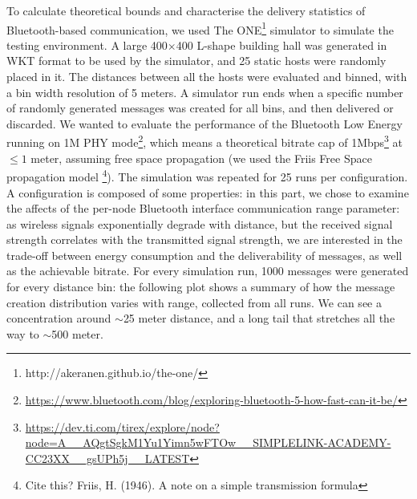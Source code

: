 To calculate theoretical bounds and characterise the delivery statistics of Bluetooth-based communication, we used The ONE\footnote{http://akeranen.github.io/the-one/} simulator to simulate the testing environment.
A large 400$\times$400 L-shape building hall was generated in WKT format to be used by the simulator, and 25 static hosts were randomly placed in it.
The distances between all the hosts were evaluated and binned, with a bin width resolution of 5 meters.
A simulator run ends when a specific number of randomly generated messages was created for all bins, and then delivered or discarded.
We wanted to evaluate the performance of the Bluetooth Low Energy running on 1M PHY mode\footnote{\href{Bluetooth SIG}{\url{https://www.bluetooth.com/blog/exploring-bluetooth-5-how-fast-can-it-be/}}}, which means a theoretical bitrate cap of 1Mbps\footnote{\href{Texas Instruments}{\url{https://dev.ti.com/tirex/explore/node?node=A__AQgtSgkM1Yu1Yimn5wFTOw__SIMPLELINK-ACADEMY-CC23XX__gsUPh5j__LATEST}}} at $\le1$ meter, assuming free space propagation (we used the Friis Free Space propagation model \footnote{Cite this? Friis, H. (1946). A note on a simple transmission formula}).
The simulation was repeated for 25 runs per configuration. A configuration is composed of some properties: in this part, we chose to examine the affects of the per-node Bluetooth interface communication range parameter: as wireless signals exponentially degrade with distance, but the received signal strength correlates with the transmitted signal strength, we are interested in the trade-off between energy consumption and the deliverability of messages, as well as the achievable bitrate.
For every simulation run, 1000 messages were generated for every distance bin: the following plot shows a summary of how the message creation distribution varies with range, collected from all runs. We can see a concentration around $\sim$25 meter distance, and a long tail that stretches all the way to $\sim$500 meter.
